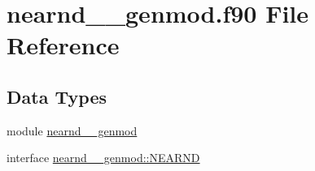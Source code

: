 \hypertarget{nearnd____genmod_8f90}{\section{nearnd\+\_\+\+\_\+genmod.\+f90 File Reference}
\label{nearnd____genmod_8f90}
}
\subsection*{Data Types}
\begin{DoxyCompactItemize}
\item 
module \hyperlink{classnearnd____genmod}{nearnd\+\_\+\+\_\+genmod}
\item 
interface \hyperlink{interfacenearnd____genmod_1_1NEARND}{nearnd\+\_\+\+\_\+genmod\+::\+N\+E\+A\+R\+N\+D}
\end{DoxyCompactItemize}
